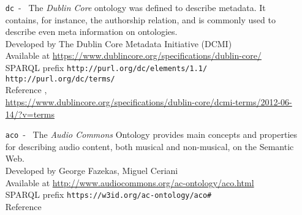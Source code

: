 \documentclass[11pt, twoside, openright]{report}   	%
\begin{document}
\begin{enumerate}
\item[\texttt{dc}~-~] The \textit{Dublin Core} ontology was defined to describe metadata. It contains, for instance, the authorship relation, and is commonly used to describe even meta information on ontologies. \\
Developed by \hfill The Dublin Core Metadata Initiative (DCMI) \\
Available at \hfill \url{https://www.dublincore.org/specifications/dublin-core/} \\
SPARQL prefix \hfill \texttt{http://purl.org/dc/elements/1.1/} \\
\null \hfill \texttt{http://purl.org/dc/terms/} \\
Reference \hfill \cite{weibel2000dublin}, \\
\null \hfill \url{https://www.dublincore.org/specifications/dublin-core/dcmi-terms/2012-06-14/?v=terms}

\item[\texttt{aco}~-~] The \textit{Audio Commons} Ontology provides main concepts and properties for describing audio content, both musical and non-musical, on the Semantic Web. \\
Developed by \hfill George Fazekas, Miguel Ceriani \\
Available at \hfill \url{http://www.audiocommons.org/ac-ontology/aco.html} \\
SPARQL prefix \hfill \texttt{https://w3id.org/ac-ontology/aco\#} \\
Reference \hfill \cite{ceriani2018audio} \\
\end{enumerate}
\end{document}
